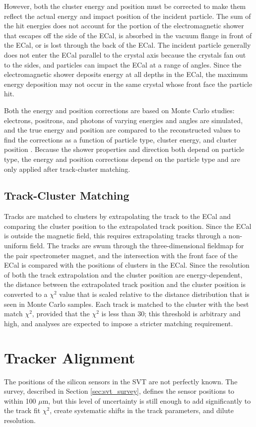 However, both the cluster energy and position must be corrected to make them reflect the actual energy and impact position of the incident particle.
The sum of the hit energies does not account for the portion of the electromagnetic shower that escapes off the side of the ECal, is absorbed in the vacuum flange in front of the ECal, or is lost through the back of the ECal.
The incident particle generally does not enter the ECal parallel to the crystal axis because the crystals fan out to the sides, and particles can impact the ECal at a range of angles.
Since the electromagnetic shower deposits energy at all depths in the ECal, the maximum energy deposition may not occur in the same crystal whose front face the particle hit.

Both the energy and position corrections are based on Monte Carlo studies: electrons, positrons, and photons of varying energies and angles are simulated, and the true energy and position are compared to the reconstructed values to find the corrections as a function of particle type, cluster energy, and cluster position \cite{szumila-vance_hps/ecal_2014}.
Because the shower properties and direction both depend on particle type, the energy and position corrections depend on the particle type and are only applied after track-cluster matching.

\subsection{Track-Cluster Matching}
\label{sec:matching}
Tracks are matched to clusters by extrapolating the track to the ECal and comparing the cluster position to the extrapolated track position.
Since the ECal is outside the magnetic field, this requires extrapolating tracks through a non-uniform field.
The tracks are swum through the three-dimensional fieldmap for the pair spectrometer magnet, and the intersection with the front face of the ECal is compared with the positions of clusters in the ECal.
Since the resolution of both the track extrapolation and the cluster position are energy-dependent, the distance between the extrapolated track position and the cluster position is converted to a $\chi^2$ value that is scaled relative to the distance distribution that is seen in Monte Carlo samples.
Each track is matched to the cluster with the best match $\chi^2$, provided that the $\chi^2$ is less than 30; this threshold is arbitrary and high, and analyses are expected to impose a stricter matching requirement.

\section{Tracker Alignment}
The positions of the silicon sensors in the SVT are not perfectly known.
The survey, described in Section \ref{sec:svt_survey}, defines the sensor positions to within 100 $\mu$m, but this level of uncertainty is still enough to add significantly to the track fit $\chi^2$, create systematic shifts in the track parameters, and dilute resolution.

